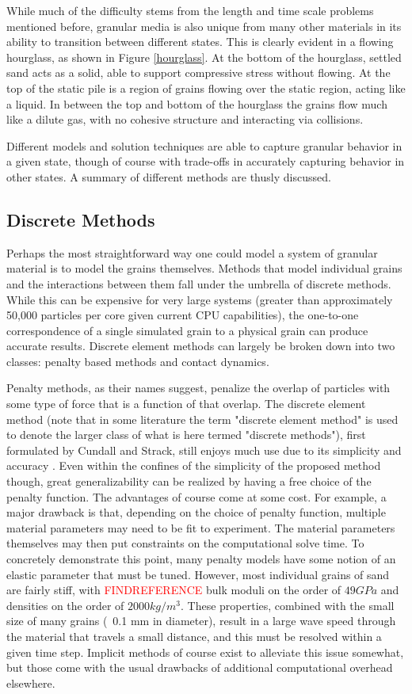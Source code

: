 While much of the difficulty stems from the length and time scale problems mentioned before, granular media is also unique from many other materials in its ability to transition between different states. This is clearly evident in a flowing hourglass, as shown in Figure \ref{hourglass}. At the bottom of the hourglass, settled sand acts as a solid, able to support compressive stress without flowing. At the top of the static pile is a region of grains flowing over the static region, acting like a liquid. In between the top and bottom of the hourglass the grains flow much like a dilute gas, with no cohesive structure and interacting via collisions.

Different models and solution techniques are able to capture granular behavior in a given state, though of course with trade-offs in accurately capturing behavior in other states. A summary of different methods are thusly discussed. 

\subsection{Discrete Methods}
Perhaps the most straightforward way one could model a system of granular material is to model the grains themselves. Methods that model individual grains and the interactions between them fall under the umbrella of discrete methods. While this can be expensive for very large systems (greater than approximately 50,000 particles per core given current CPU capabilities), the one-to-one correspondence of a single simulated grain to a physical grain can produce accurate results. Discrete element methods can largely be broken down into two classes: penalty based methods and contact dynamics.

Penalty methods, as their names suggest, penalize the overlap of particles with some type of force that is a function of that overlap. The discrete element method (note that in some literature the term "discrete element method" is used to denote the larger class of what is here termed "discrete methods"), first formulated by Cundall and Strack, still enjoys much use due to its simplicity and accuracy \cite{Cundall:1979}. Even within the confines of the simplicity of the proposed method though, great generalizability can be realized by having a free choice of the penalty function. The advantages of course come at some cost. For example, a major drawback is that, depending on the choice of penalty function, multiple material parameters may need to be fit to experiment. The material parameters themselves may then put constraints on the computational solve time. To concretely demonstrate this point, many penalty models have some notion of an elastic parameter that must be tuned. However, most individual grains of sand are fairly stiff, with \textcolor{red}{FINDREFERENCE} bulk moduli on the order of $49 GPa$ and densities on the order of $2000 kg/m^3$. These properties, combined with the small size of many grains (~0.1 mm in diameter), result in a large wave speed through the material that travels a small distance, and this must be resolved within a given time step. Implicit methods of course exist to alleviate this issue somewhat, but those come with the usual drawbacks of additional computational overhead elsewhere.

